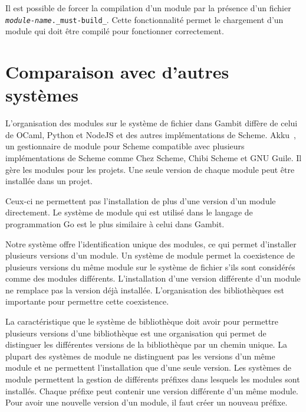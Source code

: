 Il est possible de forcer la compilation d'un module par la présence d'un fichier
\texttt{\textit{module-name}.\_must-build\_}. Cette fonctionnalité permet le chargement d'un
module qui doit être compilé pour fonctionner correctement.


\section{Comparaison avec d'autres systèmes}
L'organisation des modules sur le système de fichier dans Gambit diffère de
celui de OCaml, Python et NodeJS et des autres implémentations de Scheme.
Akku~\cite{Akku.scm}, un gestionnaire de module pour Scheme compatible avec
plusieurs implémentations de Scheme comme Chez Scheme, Chibi Scheme et GNU
Guile. Il gère les modules pour les projets. Une seule version de chaque module
peut être installée dans un projet.

Ceux-ci ne permettent pas l'installation de plus d'une version d'un module
directement. Le système de module qui est utilisé dans le langage de
programmation Go est le plus similaire à celui dans Gambit.

Notre système offre l'identification unique des modules, ce qui permet
d'installer plusieurs versions d'un module.  Un système de module permet la
coexistence de plusieurs versions du même module sur le système de fichier
s'ils sont considérés comme des modules différents.  L'installation d'une
version différente d'un module ne remplace pas la version déjà installée.
L'organisation des bibliothèques est importante pour permettre cette
coexistence.

La caractéristique que le système de bibliothèque doit avoir pour permettre
plusieurs versions d'une bibliothèque est une organisation qui permet de
distinguer les différentes versions de la bibliothèque par un chemin unique.
La plupart des systèmes de module ne distinguent pas les versions d'un même
module et ne permettent l'installation que d'une seule version. Les systèmes de
module permettent la gestion de différents préfixes dans lesquels les modules sont
installés. Chaque préfixe peut contenir une version différente d'un même
module. Pour avoir une nouvelle version d'un module, il faut créer un nouveau
préfixe.



